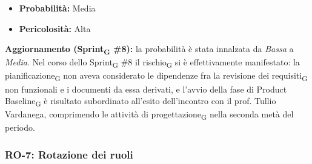 ﻿\documentclass[a4paper, 10pt, colorlinks=true, linkcolor=black, urlcolor=blue, citecolor=blue, hidelinks]{article}
\begin{document}
\begin{itemize}
    \item \textbf{Probabilità:} Media

    \item \textbf{Pericolosità:} Alta
\end{itemize}

\noindent
\textbf{Aggiornamento (Sprint\textsubscript{G} \#8):} la probabilità è stata innalzata da \textit{Bassa} a \textit{Media}. Nel corso dello Sprint\textsubscript{G} \#8 il rischio\textsubscript{G} si è effettivamente manifestato: la pianificazione\textsubscript{G} non aveva considerato le dipendenze fra la revisione dei requisiti\textsubscript{G} non funzionali e i documenti da essa derivati, e l'avvio della fase di Product Baseline\textsubscript{G} è risultato subordinato all'esito dell'incontro con il prof. Tullio Vardanega, comprimendo le attività di progettazione\textsubscript{G} nella seconda metà del periodo.

\subsubsection{RO-7: Rotazione dei ruoli}
\end{document}
